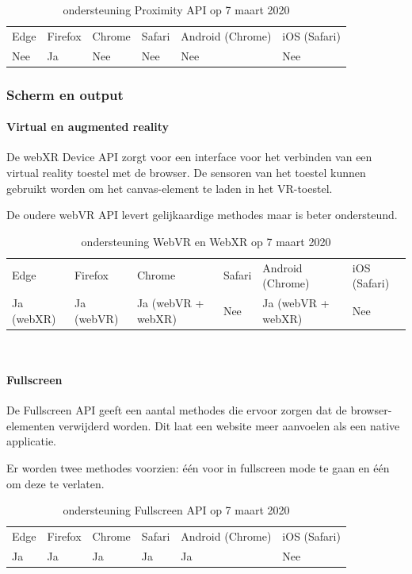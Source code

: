 	\begin{table}[H]
		\centering
		\begin{tabular}{llllll}
			Edge & Firefox & Chrome & Safari & Android (Chrome) & iOS (Safari) \\
			Nee   & Ja      &  Nee   & Nee     & Nee               & Nee          
		\end{tabular}	
		\caption{ondersteuning  Proximity API op 7 maart 2020 }
	\end{table}
	
	
	
	\subsubsection{Scherm en output}
	\paragraph{Virtual en augmented reality }
	De webXR Device API \autocite{Jones2019} zorgt voor een interface voor het verbinden van een virtual reality toestel met de browser. De sensoren van het toestel kunnen gebruikt worden om het canvas-element te laden in het VR-toestel.
	
	De oudere webVR API levert gelijkaardige methodes maar is beter ondersteund.
	
	\begin{table}[H]
		\centering
		\begin{tabular}{llllll}
			Edge & Firefox & Chrome & Safari & Android (Chrome) & iOS (Safari) \\
			Ja (webXR)  & 	Ja (webVR)  &  	Ja (webVR + webXR)  & Nee  & Ja (webVR + webXR) & Nee          
		\end{tabular}	
		\caption{ondersteuning  WebVR en WebXR op 7 maart 2020 }
	\end{table}\
	
	\paragraph{Fullscreen }
	De Fullscreen API \autocite{Kesteren2014} geeft een aantal methodes die ervoor zorgen dat de browser-elementen verwijderd worden. Dit laat een website meer aanvoelen als een native applicatie.
	
	Er worden twee methodes voorzien: één voor in fullscreen mode te gaan en één om deze te verlaten.
	
	\begin{table}[H]
		\begin{tabular}{llllll}
			Edge & Firefox & Chrome & Safari & Android (Chrome) & iOS (Safari) \\
			Ja   & Ja      &  Ja   & Ja     & Ja               & Nee          
		\end{tabular}	
		\caption{ondersteuning  Fullscreen API op 7 maart 2020 }
	\end{table}
	
